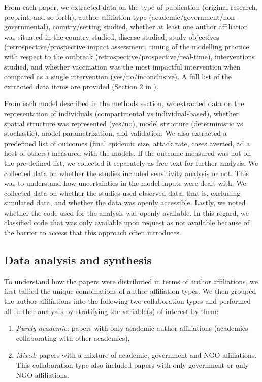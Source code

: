 \documentclass[10pt,letterpaper]{article}
\begin{document}
From each paper, we extracted data on the type of publication (original research, preprint, and so forth), author affiliation type (academic/government/non-governmental), country/setting studied, whether at least one author affiliation was situated in the country studied, disease studied, study objectives (retrospective/prospective impact assessment, timing of the modelling practice with respect to the outbreak (retrospective/prospective/real-time), interventions studied, and whether vaccination was the most impactful intervention when compared as a single intervention (yes/no/inconclusive). A full list of the extracted data items are provided (Section 2 in ).  

From each model described in the methods section, we extracted data on the representation of individuals (compartmental vs individual-based), whether spatial structure was represented (yes/no), model structure (deterministic vs stochastic), model parametrization, and validation. We also extracted a predefined list of outcomes (final epidemic size, attack rate, cases averted, ad a host of others) measured with the models. If the outcome measured was not on the pre-defined list, we collected it separately as free text for further analysis. We collected data on whether the studies included sensitivity analysis or not. This was to understand how uncertainties in the model inputs were dealt with.  We collected data on whether the studies used observed data, that is, excluding simulated data, and whether the data was openly accessible. Lastly, we noted whether the code used for the analysis was openly available. In this regard, we classified code that was only available upon request as not available because of the barrier to access that this approach often introduces.


\subsection*{Data analysis and synthesis}
To understand how the papers were distributed in terms of author affiliations, we first tallied the unique combinations of author affiliation types. We then grouped the author affiliations into the following two collaboration types and performed all further analyses by stratifying the variable(s) of interest by them:

\begin{enumerate}
	\item \textit{Purely academic:} papers with only academic author affiliations (academics collaborating with other academics), 
	\item \textit{Mixed:} papers with a mixture of academic, government and NGO affiliations. This collaboration type also included papers with only government or only NGO affiliations. 
\end{enumerate}
\end{document}
